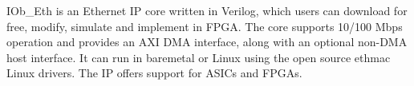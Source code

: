IOb_Eth is an Ethernet IP core written in Verilog, which
users can download for free, modify, simulate and implement in FPGA.
The core supports 10/100 Mbps operation and provides an AXI DMA interface, along with an optional non-DMA host interface. It can run in baremetal or Linux using the open source ethmac Linux drivers.
The IP offers support for ASICs and FPGAs.
